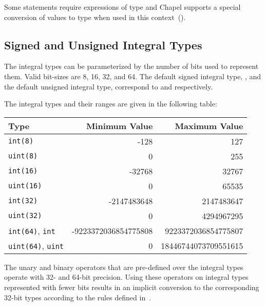 
Some statements require expressions of  type and Chapel
supports a special conversion of values to  type when used
in this context~().

\subsection{Signed and Unsigned Integral Types}
\label{Signed_and_Unsigned_Integral_Types}

The integral types can be parameterized by the number of bits used to
represent them.  Valid bit-sizes are 8, 16, 32, and 64.  The default signed integral type, , and the
default unsigned integral type,  correspond to 
 and  respectively.

%

The integral types and their ranges are given in the following table:

\begin{center}
\begin{tabular}{|l|r|r|}
\hline
{\bf Type} & {\bf Minimum Value} & {\bf Maximum Value} \\
\hline
{\tt int(8)} & -128 & 127 \\
{\tt uint(8)} & 0 & 255 \\
{\tt int(16)} & -32768 & 32767 \\
{\tt uint(16)} & 0 & 65535 \\
{\tt int(32)} & -2147483648 & 2147483647 \\
{\tt uint(32)} & 0 & 4294967295 \\
{\tt int(64)}, {\tt int} & -9223372036854775808 & 9223372036854775807 \\
{\tt uint(64)}, {\tt uint} & 0 & 18446744073709551615 \\
\hline
\end{tabular}
\end{center}

The unary and binary operators that are pre-defined over the integral
types operate with 32- and 64-bit precision.  Using these operators on
integral types represented with fewer bits results in an implicit
conversion to the corresponding 32-bit types
according to the rules defined in~.


